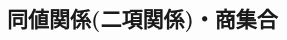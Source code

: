 \documentclass[dvipdfmx,a4paper,11pt]{article}
\newcommand{\R}{\mathbb{R}}
\newcommand{\Z}{\mathbb{Z}}
\newcommand{\Q}{\mathbb{Q}}
\newcommand{\N}{\mathbb{N}}
\theoremstyle{definition}
\begin{document}

 \newpage

 \begin{center}
\section{同値関係(二項関係)・商集合}
\label{sec-6}
\end{center}
\end{document}
